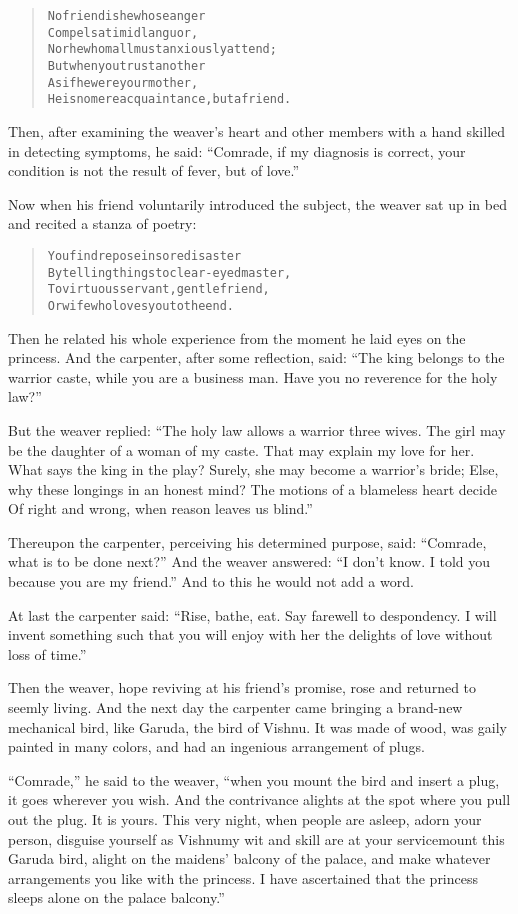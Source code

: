 \documentclass[article, twoside, 14pt]{memoir}
\renewenvironment{verbatim}{%
\begin{quote}%
\vskip -10pt%
\begin{alltt}\normalfont\large}{\end{alltt}%
\end{quote}%
\vskip -10pt
} %
\begin{document}
\begin{verbatim}
No friend is he whose anger
Compels a timid languor,
    Nor he whom all must anxiously attend;
But when you trust another
As if he were your mother,
    He is no mere acquaintance, but a friend.
\end{verbatim}
Then, after examining the weaver's heart and other members with a
hand skilled in detecting symptoms, he said:
``Comrade, if my diagnosis is correct, your condition is not the result of fever, but of love.''

Now when his friend voluntarily introduced the subject, the weaver
sat up in bed and recited a stanza of poetry:

\begin{verbatim}
You find repose in sore disaster
By telling things to clear-eyed master,
To virtuous servant, gentle friend,
Or wife who loves you to the end.
\end{verbatim}
Then he related his whole experience from the moment he laid eyes
on the princess. And the carpenter, after some reflection, said:
``The king belongs to the warrior caste, while you are a business man. Have you no reverence for the holy law?''

But the weaver replied:
``The holy law allows a warrior three wives. The girl may be the daughter of a woman of my caste. That may explain my love for her. What says the king in the play? Surely, she may become a warrior's bride; Else, why these longings in an honest mind? The motions of a blameless heart decide Of right and wrong, when reason leaves us blind.''

Thereupon the carpenter, perceiving his determined purpose, said:
``Comrade, what is to be done next?'' And the weaver answered:
``I don't know. I told you because you are my friend.'' And to this
he would not add a word.

At last the carpenter said:
``Rise, bathe, eat. Say farewell to despondency. I will invent something such that you will enjoy with her the delights of love without loss of time.''

Then the weaver, hope reviving at his friend's promise, rose
and returned to seemly living. And the next day the carpenter came
bringing a brand-new mechanical bird, like Garuda, the bird of
Vishnu. It was made of wood, was gaily painted in many colors, and
had an ingenious arrangement of plugs.

``Comrade,'' he said to the weaver,
``when you mount the bird and insert a plug, it goes wherever you wish. And the contrivance alights at the spot where you pull out the plug. It is yours. This very night, when people are asleep, adorn your person, disguise yourself as Vishnu{\textemdash}my wit and skill are at your service{\textemdash}mount this Garuda bird, alight on the maidens' balcony of the palace, and make whatever arrangements you like with the princess. I have ascertained that the princess sleeps alone on the palace balcony.''
\end{document}
